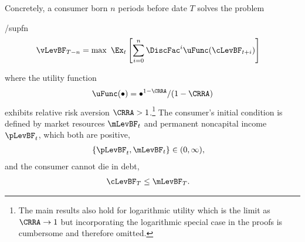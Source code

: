 \documentclass[BufferStockTheory]{subfiles}
\begin{document}
Concretely, a consumer born $n$ periods before date $T$ solves the problem
\begin{verbatimwrite}{\EqDir/supfn}
  \begin{align*}%
    \vLevBF_{T-n} & = \max~ \Ex_{t}\left[\sum_{i=0}^{n} \DiscFac^{i} \uFunc(\cLevBF_{t+i})\right]
  \end{align*}
\end{verbatimwrite}

where the utility function
\begin{align}
  \uFunc(\bullet)=\bullet^{1-\CRRA}/(1-\CRRA) \label{eq:crrautil}
\end{align}
exhibits relative risk aversion $\CRRA > 1$.\footnote{The main
  results also hold for logarithmic utility which is the limit as
  $\CRRA \rightarrow 1$ but incorporating the logarithmic special case
  in the proofs is cumbersome and therefore
  omitted.}  The consumer's initial condition is
defined by market resources $\mLevBF_{t}$ and permanent noncapital income $\pLevBF_{t}$, which
both are positive,
\begin{align}
  \{\pLevBF_{t},\mLevBF_{t}\} & \in (0,\infty) \label{eq:pLevBFandmLevBFgt0},
\end{align}
and the consumer cannot die in debt,
\begin{align}
  \cLevBF_{T} & \leq  \mLevBF_{T} \label{eq:NoDebtAtDeath}.
\end{align}
\end{document}
